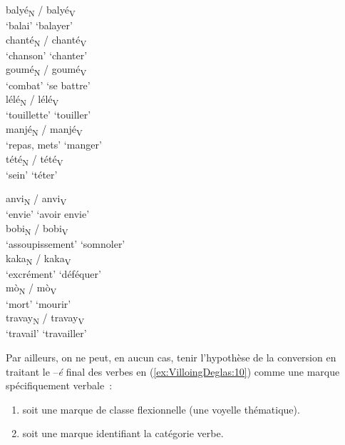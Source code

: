 \documentclass[output=paper]{langsci/langscibook}
\begin{document}
\ea\label{ex:VilloingDeglas:11}

  \ea\label{ex:VilloingDeglas:11a}

  \ea \gll balyé\textsubscript{N} / balyé\textsubscript{V}\\
  {`balai'} {} {`balayer'}\\
  \ex \gll chanté\textsubscript{N} / chanté\textsubscript{V}\\
  {`chanson'} {} {`chanter'}\\
  \ex \gll goumé\textsubscript{N} / goumé\textsubscript{V}\\
  {`combat'} {} {`se battre'}\\
  \ex \gll lélé\textsubscript{N} / lélé\textsubscript{V}\\
  {`touillette'} {} {`touiller'}\\
  \ex \gll manjé\textsubscript{N} / manjé\textsubscript{V}\\
  {`repas, mets'} {} {`manger'}\\
  \ex \gll tété\textsubscript{N} / tété\textsubscript{V}\\
  {`sein'} {} {`téter'}\\
  \z

  \ex\label{ex:VilloingDeglas:11b}

  \ea \gll anvi\textsubscript{N} / anvi\textsubscript{V}\\
  {`envie'} {} {`avoir envie'}\\
  \ex \gll bobi\textsubscript{N} / bobi\textsubscript{V}\\
  {`assoupissement'} {} {`somnoler'}\\
  \ex \gll kaka\textsubscript{N} / kaka\textsubscript{V}\\
  {`excrément'} {} {`déféquer'}\\
  \ex \gll mò\textsubscript{N} / mò\textsubscript{V}\\
  {`mort'} {} {`mourir'}\\
  \ex \gll travay\textsubscript{N} / travay\textsubscript{V}\\
  {`travail'} {} {`travailler'}\\
  \z
  \z
\z

Par ailleurs, on ne peut, en aucun cas, tenir l'hypothèse de la
conversion en traitant le --\emph{é} final des verbes en (\ref{ex:VilloingDeglas:10}) comme une
marque spécifiquement verbale~:

\begin{enumerate}[label=(\alph*)]
\item soit une marque de classe flexionnelle (une voyelle thématique).

\item soit une marque identifiant la catégorie verbe.
\end{enumerate}
\end{document}
